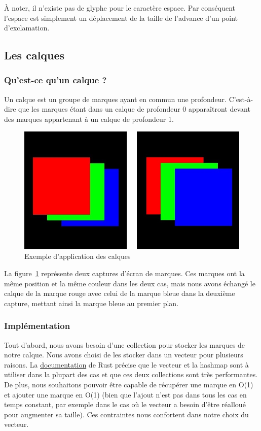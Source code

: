 \documentclass[12pt]{article}
\begin{document}
À noter, il n'existe pas de glyphe pour le caractère espace. Par conséquent l'espace est simplement un déplacement de la taille de l'advance d'un point d'exclamation.

\subsection{Les calques}
\subsubsection{Qu'est-ce qu'un calque ?}
Un calque est un groupe de marques ayant en commun une profondeur. C'est-à-dire que les marques étant dans
un calque de profondeur 0 apparaîtront devant des marques appartenant à un calque de profondeur 1.

\begin{figure}[htp]
  \centering
  \includegraphics[scale=0.8]{images/calque-exemple}
  \caption{Exemple d'application des calques}
  \label{fig:calque-ex}
\end{figure}

La figure~\ref{fig:calque-ex} représente deux captures d'écran de marques.
Ces marques ont la même position et la même couleur dans les deux cas, mais nous avons échangé le calque
de la marque rouge avec celui de la marque bleue dans la deuxième capture, mettant ainsi la marque bleue
au premier plan.

\subsubsection{Implémentation}

Tout d'abord, nous avons besoin d'une collection pour stocker les marques de notre calque.
Nous avons choisi de les stocker dans un vecteur pour plusieurs raisons.
La \href{https://doc.rust-lang.org/std/collections/index.html}{documentation} de Rust précise que le
vecteur et la hashmap sont à utiliser dans la plupart des cas et que ces deux collections sont très
performantes.
De plus, nous souhaitons pouvoir être capable de récupérer une marque en O(1) et ajouter une marque en
O(1) (bien que l'ajout n'est pas dans tous les cas en temps constant, par exemple dans le cas où le
vecteur a besoin d'être réalloué pour augmenter sa taille). Ces contraintes nous confortent dans notre
choix du vecteur.
\end{document}
